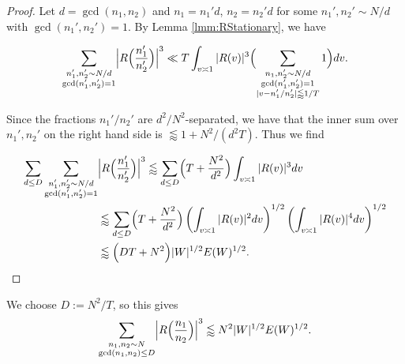 \documentclass{amsart}
\theoremstyle{plain}
\numberwithin{equation}{section}
\begin{document}
\begin{proof}
Let $d=\gcd(n_1,n_2)$ and $n_1=n_1'd$, $n_2=n_2'd$ for some $n_1',n_2'\sim N/d$ with $\gcd(n_1',n_2')=1$. By Lemma \ref{lmm:RStationary}, we have

\[
\sum_{\substack{n_1',n_2'\sim N/d\\ \gcd(n_1',n_2')=1}}\Bigl|R\Bigl(\frac{n_1'}{n_2'}\Bigr)\Bigr|^3\ll T\int_{v\asymp 1} |R(v)|^3 \Bigl( \sum_{\substack{n_1,n_2'\sim N/d\\ \gcd(n_1',n_2')=1\\ |v - n_1'/n_2'| \lessapprox 1/T}}1\Bigr)dv.
\]

Since the fractions $n_1'/n_2'$ are $d^2/N^2$-separated, we have that the inner sum over $n_1',n_2'$ on the right hand side is $\lessapprox 1+N^2/(d^2T)$. Thus we find

\begin{align*}
\sum_{d\le  D} \sum_{\substack{n_1',n_2'\sim N/d\\ \gcd(n_1',n_2')=1}}&  \Big| R \Bigl(\frac{n_1'}{n_2'}\Bigr)\Big|^3 \lessapprox \sum_{d\le D}\Bigl(T+\frac{N^2}{d^2}\Bigr) \int_{v\asymp 1} |R(v)|^3dv \\
&\lessapprox \sum_{d\le D}\Bigl(T+\frac{N^2}{d^2}\Bigr) \left( \int_{v \asymp 1} |R(v)|^2 dv \right)^{1/2} \left( \int_{v \asymp 1} |R(v)|^4 dv \right)^{1/2} \\
&\lessapprox \Bigl( D T + N^2 \Bigr) |W|^{1/2} E(W)^{1/2}. \qedhere
\end{align*}
\end{proof}

%
%


We choose $D:=N^2/T$, so this gives 
\begin{equation}
\sum_{\substack{n_1,n_2\sim N\\ \gcd(n_1,n_2)\le D}}\Bigl|R\Bigl(\frac{n_1}{n_2}\Bigr)\Bigr|^3\lessapprox N^2|W|^{1/2}E(W)^{1/2}.\label{eq:SmallD}
\end{equation}

%
%
\end{document}
